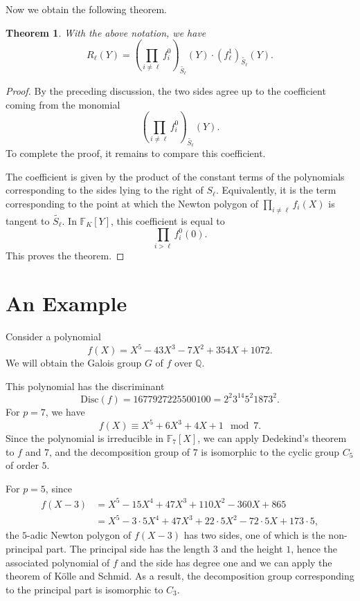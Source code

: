 \documentclass{article}
\newcommand{\field}[1]{\mathbb{#1}}
\newcommand{\Q}{\field{Q}}
\newcommand{\F}{\field{F}}
\newtheorem{theorem}{Theorem}[section]
\theoremstyle{definition}
\theoremstyle{remark}
\numberwithin{equation}{section}
\begin{document}
  Now we obtain the following theorem.
  \begin{theorem}\label{thm:our main theorem 2}
    With the above notation, we have 
    \[
      R_{\ell}(Y) = \left(\prod_{i\ne\ell}f_{i}^{0}\right)_{\widetilde{S_{\ell}}}(Y) \cdot (f_{\ell}^{1})_{\widetilde{S_{\ell}}}(Y).
    \]
  \end{theorem}

  \begin{proof}
  By the preceding discussion, the two sides agree up to the coefficient coming from the monomial
  \[
    \left(\prod_{i\ne\ell}f_{i}^{0}\right)_{\widetilde{S_{\ell}}}(Y). 
  \]
  To complete the proof, it remains to compare this coefficient. 

  The coefficient is given by the product of the constant terms of the polynomials corresponding to the sides 
  lying to the right of $S_{\ell}$. 
  Equivalently, it is the term corresponding to the point at which the Newton polygon of $\prod_{i\ne\ell}f_{i}(X)$ 
  is tangent to $\widetilde{S_{\ell}}$. 
  In $\field{F}_K[Y]$, this coefficient is equal to 
  \[
    \prod_{i > \ell} f_i^0(0). 
  \]
  This proves the theorem. 
  \end{proof}

  \section{An Example}\label{sec:example}

  Consider a polynomial 
  \[
    f(X) = X^5 - 43X^3 - 7X^2 + 354X + 1072.
  \]
  We will obtain the Galois group $G$ of $f$ over $\Q$.

  This polynomial has the discriminant
  \[
    \mathrm{Disc}(f) = 1677927225500100 = 2^{2} 3^{14} 5^{2} 1873^{2}.
  \]
  For $p=7$, we have
  \[
    f(X) \equiv X^5 + 6X^3 + 4X +1 \mod 7.
  \] 
  Since the polynomial is irreducible in $\F_{7}[X]$, we can apply Dedekind's theorem to $f$ and $7$,
  and the decomposition group of $7$ is isomorphic to the cyclic group $C_5$ of order $5$. 

  For $p=5$, since
  \begin{align}
    f(X-3)  &= X^5 - 15X^4 + 47X^3 + 110X^2 -360X + 865\\
            &= X^5 - 3\cdot 5X^4 + 47X^3 + 22\cdot 5X^2 - 72\cdot 5X + 173\cdot 5,
  \end{align}
  the $5$-adic Newton polygon of $f(X-3)$ has two sides, one of which is the non-principal part.
  The principal side has the length $3$ and the height $1$, hence the associated polynomial of $f$ and the side has degree one
  and we can apply the theorem of K\"{o}lle and Schmid.
  As a result, the decomposition group corresponding to the principal part is isomorphic to $C_{3}$.
\end{document}
